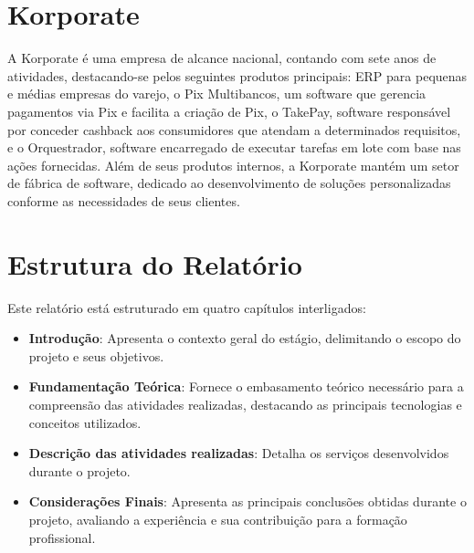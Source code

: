\section{Korporate}

A Korporate é uma empresa de alcance nacional, contando com sete anos de atividades, 
destacando-se pelos seguintes produtos principais: ERP para pequenas e médias 
empresas do varejo, o Pix Multibancos, um software que gerencia pagamentos via Pix 
e facilita a criação de Pix, o TakePay, software responsável por conceder cashback 
aos consumidores que atendam a determinados requisitos, e o Orquestrador, software 
encarregado de executar tarefas em lote com base nas ações fornecidas. Além de seus 
produtos internos, a Korporate mantém um setor de fábrica de software, dedicado ao 
desenvolvimento de soluções personalizadas conforme as necessidades de seus 
clientes.

\section{Estrutura do Relatório}

Este relatório está estruturado em quatro capítulos interligados:

\begin{itemize}

\item \textbf{Introdução}: Apresenta o contexto geral do estágio, delimitando o 
escopo do projeto e seus objetivos.

\item \textbf{Fundamentação Teórica}:  Fornece o embasamento teórico necessário 
para a compreensão das atividades realizadas, destacando as principais tecnologias 
e conceitos utilizados.

\item \textbf{Descrição das atividades realizadas}: Detalha os serviços 
desenvolvidos durante o projeto.

\item \textbf{Considerações Finais}: Apresenta as principais conclusões obtidas 
durante o projeto, avaliando a experiência e sua contribuição para a formação 
profissional.

\end{itemize}